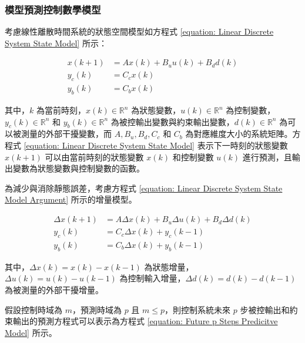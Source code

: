 \subsubsection{模型預測控制數學模型}

考慮線性離散時間系統的狀態空間模型如方程式 \eqref{equation: Linear Discrete System State Model} 所示：

\begin{equation}\label{equation: Linear Discrete System State Model}
  \begin{aligned}
    x(k + 1)    &= Ax(k) + B_{u} u(k) + B_{d} d(k) \\
    y_{c} (k)   &= C_{c} x(k)                      \\
    y_{b} (k)   &= C_{b} x(k)
  \end{aligned}
\end{equation}

其中，$k$ 為當前時刻，$x(k) \in \mathbb{R}^{n}$ 為狀態變數，$u(k) \in \mathbb{R}^{n}$ 為控制變數，$y_{c}(k) \in \mathbb{R}^{n}$ 和 $y_{b} (k) \in \mathbb{R}^{n}$ 為被控輸出變數與約束輸出變數，$d(k) \in \mathbb{R}^{n}$ 為可以被測量的外部干擾變數，而 $A, B_{u}, B_{d}, C_{c}$ 和 $C_{b}$ 為對應維度大小的系統矩陣。方程式 \eqref{equation: Linear Discrete System State Model} 表示下一時刻的狀態變數 $x(k + 1)$ 可以由當前時刻的狀態變數 $x(k)$ 和控制變數 $u(k)$ 進行預測，且輸出變數為狀態變數與控制變數的函數。

為減少與消除靜態誤差，考慮方程式 \eqref{equation: Linear Discrete System State Model Argument} 所示的增量模型。

\begin{equation}\label{equation: Linear Discrete System State Model Argument}
  \begin{aligned}
    \Delta x(k + 1)     &= A \Delta x(k) + B_{u} \Delta u(k) + B_{d} \Delta d(k) \\
    y_{c} (k)           &= C_{c} \Delta x(k) + y_{c} (k-1)                       \\
    y_{b} (k)           &= C_{b} \Delta x(k) + y_{b} (k-1)
  \end{aligned}
\end{equation}

其中，$\Delta x(k) = x(k) - x(k-1)$ 為狀態增量，$\Delta u(k) = u(k) - u(k-1)$ 為控制輸入增量，$\Delta d(k) = d(k) - d(k-1)$ 為被測量的外部干擾增量。

假設控制時域為 $m$，預測時域為 $p$ 且 $m \leq p$，則控制系統未來 $p$ 步被控輸出和約束輸出的預測方程式可以表示為方程式 \eqref{equation: Future p Steps Predicitve Model} 所示。

